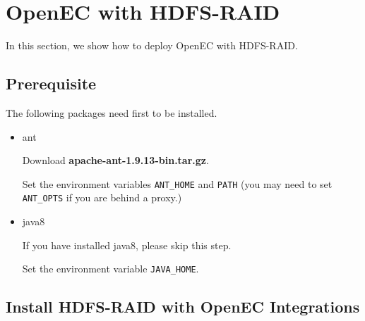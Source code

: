 \documentclass[letterpaper,12pt]{article}
\newcommand{\openec}{{\sf\small OpenEC}\xspace}
\begin{document}
\section{OpenEC with HDFS-RAID}
\label{sec:hdfsraid}

In this section, we show how to deploy \openec with HDFS-RAID.

\subsection{Prerequisite}

The following packages need first to be installed.

\begin{itemize}

\item ant  

Download {\bf apache-ant-1.9.13-bin.tar.gz}.

\begin{center}
\noindent{}
\end{center}

Set the environment variables {\tt ANT\_HOME} and {\tt PATH} (you may need to
set {\tt ANT\_OPTS} if you are behind a proxy.)

\begin{center}
\noindent{}
\end{center}

\item java8

If you have installed java8, please skip this step.

\begin{center}
\noindent{}
\end{center}

Set the environment variable {\tt JAVA\_HOME}.

\end{itemize}

\subsection{Install HDFS-RAID with OpenEC Integrations}
\end{document}
